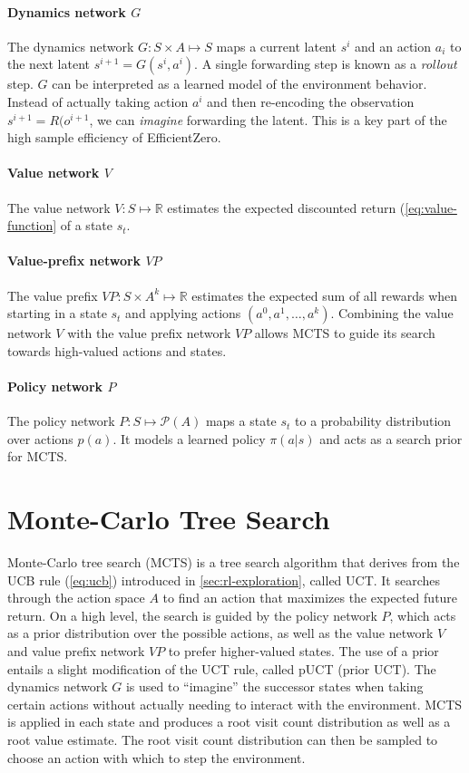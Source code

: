 \paragraph{Dynamics network $G$}
The dynamics network $G:S\times A\mapsto S$ maps a current latent $s^i$ and
an action $a_i$ to the next latent $s^{i+1}=G(s^i,a^i)$.
A single forwarding step is known as a \emph{rollout} step.
$G$ can be interpreted as a learned model of the environment behavior.
Instead of actually taking action $a^i$ and then re-encoding the observation
$s^{i+1}=R(o^{i+1}$, we can \emph{imagine} forwarding the latent.
This is a key part of the high sample efficiency of EfficientZero.

\paragraph{Value network $V$}
The value network $V:S\mapsto\mathbb{R}$ estimates the expected discounted return (\cref{eq:value-function} of 
a state $s_t$.

\paragraph{Value-prefix network $VP$}
The value prefix $VP:S\times A^k\mapsto\mathbb{R}$ estimates the expected sum of all
rewards when starting in a state $s_t$ and applying actions $(a^0,a^1,\dots,a^k)$.
Combining the value network $V$ with the value prefix network $VP$ allows MCTS to
guide its search towards high-valued actions and states.

\paragraph{Policy network $P$}
The policy network $P:S\mapsto\mathcal{P}(A)$ maps a state $s_t$ to a probability
distribution over actions $p(a)$.
It models a learned policy $\pi(a|s)$ and acts as a search prior for MCTS.

\section{Monte-Carlo Tree Search}\label{sec:ez-mcts}

Monte-Carlo tree search
(MCTS)\cite{hutchison_bandit_2006,hutchison_efficient_2007} is a tree search
algorithm that derives from the UCB rule (\cref{eq:ucb}) introduced in
\cref{sec:rl-exploration}, called UCT.
It searches through the action space $A$ to find an action that maximizes the
expected future return.
On a high level, the search is guided by the policy network $P$, which acts as
a prior distribution over the possible actions, as well as the value network
$V$ and value prefix network $VP$ to prefer higher-valued states.
The use of a prior entails a slight modification of the UCT rule, called pUCT (prior UCT).
The dynamics network $G$ is used to \enquote{imagine} the successor states when
taking certain actions without actually needing to interact with the environment.
MCTS is applied in each state and produces a root visit count distribution as well
as a root value estimate.
The root visit count distribution can then be sampled to choose an action with
which to step the environment.

